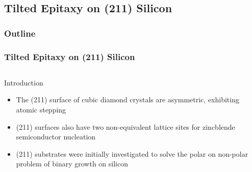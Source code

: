 \documentclass[]{beamer}%
\begin{document}
\begin{frame}
\begin{columns}[C]
\begin{column}{0.5\textwidth}
    \end{column}
    \end{columns}
\end{frame}

\subsection{Tilted Epitaxy on (211) Silicon}
\begin{frame}
    \frametitle{Outline}
\end{frame}
\begin{frame}
    \frametitle{Tilted Epitaxy on (211) Silicon}
    \begin{columns}
        \begin{column}{0.5\textwidth}
            \begin{block}{Introduction}
                \begin{itemize}[<+-| alert@+>]
                    \item The (211) surface of cubic diamond crystals are asymmetric, exhibiting atomic stepping
                    \item (211) surfaces also have two non-equivalent lattice sites for zincblende semiconductor nucleation
                    \item (211) substrates were initially investigated to solve the polar on non-polar problem of binary growth on silicon
                \end{itemize}
            \end{block}
        \end{column}
        \begin{column}{0.5\textwidth}
            \centering
             \\ \vspace{1cm}

\end{column}
\end{columns}
\end{frame}
\end{document}
